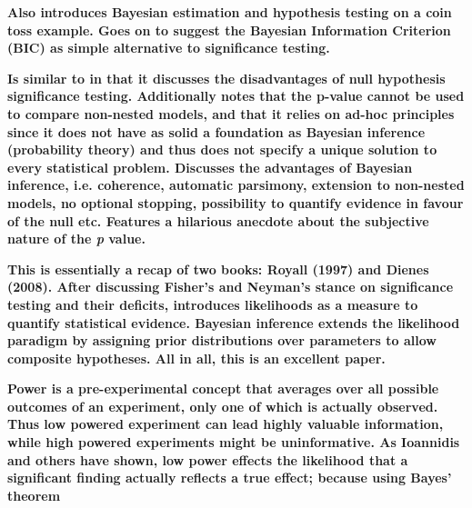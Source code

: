 \documentclass[12pt]{scrartcl}
\begin{document}
\begin{description}
  \textbf{Also introduces Bayesian estimation and hypothesis testing on a coin toss example. Goes on to suggest the Bayesian Information Criterion (BIC) as simple alternative to significance testing.}
  
  \item {}
  
  \textbf{Is similar to \cite{wagenmakers2007practical} in that it discusses the disadvantages of null hypothesis significance testing. Additionally notes that the p-value cannot be used to compare non-nested models, and that it relies on ad-hoc principles since it does not have as solid a foundation as Bayesian inference (probability theory) and thus does not specify a unique solution to every statistical problem. Discusses the advantages of Bayesian inference, i.e. coherence, automatic parsimony, extension to non-nested models, no optional stopping, possibility to quantify evidence in favour of the null etc. Features a hilarious anecdote about the subjective nature of the \emph{p} value.}
  
  \item {}
  
  \textbf{This is essentially a recap of two books: Royall (1997) and Dienes (2008). After discussing Fisher's and Neyman's stance on significance testing and their deficits, introduces likelihoods as a measure to quantify statistical evidence. Bayesian inference extends the likelihood paradigm by assigning prior distributions over parameters to allow composite hypotheses. All in all, this is an excellent paper.}
  
  \item {}
  
  \item {}
  
  \item {}
    
  \item {}
  
  \item {}
  
  \textbf{Power is a pre-experimental concept that averages over all possible outcomes of an experiment, only one of which is actually observed. Thus low powered experiment can lead highly valuable information, while high powered experiments might be uninformative. As Ioannidis \cite{ioannidis2005most} and others \cite{button2013power} have shown, low power effects the likelihood that a significant finding actually reflects a true effect; because using Bayes' theorem}
  

\end{description}
\end{document}
